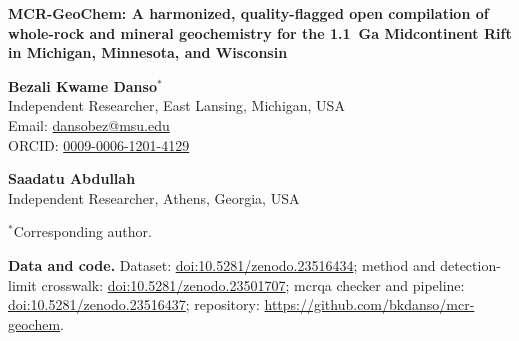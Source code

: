 \documentclass[11pt]{article}
\begin{document}
\begin{center}
{\Large\bfseries MCR-GeoChem: A harmonized, quality-flagged open compilation of whole-rock and mineral geochemistry for the 1.1~Ga Midcontinent Rift in Michigan, Minnesota, and Wisconsin\par}
\vspace{1.5em}
\textbf{Bezali Kwame Danso}$^{*}$\\ Independent Researcher, East Lansing, Michigan, USA\\ Email: \href{mailto:dansobez@msu.edu}{dansobez@msu.edu}\\ ORCID: \href{https://orcid.org/0009-0006-1201-4129}{0009-0006-1201-4129}\par\vspace{1em}\textbf{Saadatu Abdullah}\\ Independent Researcher, Athens, Georgia, USA
\end{center}
\vspace{1.5em}
\noindent $^{*}$Corresponding author.
\vspace{2em}

\noindent{}
\vspace{2em}

\noindent\textbf{Data and code.} Dataset: \href{https://doi.org/10.5281/zenodo.23516434}{doi:10.5281/zenodo.23516434}; method and detection-limit crosswalk: \href{https://doi.org/10.5281/zenodo.23501707}{doi:10.5281/zenodo.23501707}; mcrqa checker and pipeline: \href{https://doi.org/10.5281/zenodo.23516437}{doi:10.5281/zenodo.23516437}; repository: \url{https://github.com/bkdanso/mcr-geochem}.
\end{document}
